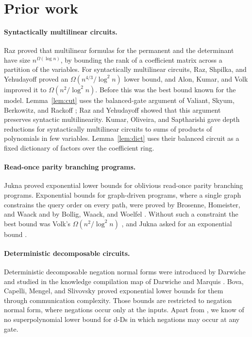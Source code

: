 \documentclass[11pt]{article}
\theoremstyle{remark}
\begin{document}
\section{Prior work}
\paragraph{Syntactically multilinear circuits.}
Raz \cite{raz} proved that multilinear formulas for the permanent and the
determinant have size \(n^{\Omega(\log n)}\), by bounding the rank of a
coefficient matrix across a partition of the variables. For syntactically
multilinear circuits, Raz, Shpilka, and Yehudayoff \cite{rsy} proved an
\(\Omega(n^{4/3}/\log^2 n)\) lower bound, and Alon, Kumar, and Volk \cite{akv}
improved it to \(\Omega(n^2/\log^2 n)\). Before \cite{hc} this was the best
bound known for the model. Lemma~\ref{lem:cut} uses the balanced-gate
argument of Valiant, Skyum, Berkowitz, and Rackoff \cite{vsbr}; Raz and
Yehudayoff \cite{ry} showed that this argument preserves syntactic
multilinearity. Kumar, Oliveira, and Saptharishi \cite{kos} gave depth
reductions for syntactically multilinear circuits to sums of products of
polynomials in few variables. Lemma~\ref{lem:dict} uses their balanced
circuit as a fixed dictionary of factors over the coefficient ring.

\paragraph{Read-once parity branching programs.}
Jukna \cite{juknacodes} proved exponential lower bounds for oblivious
read-once parity branching programs. Exponential bounds for graph-driven
programs, where a single graph constrains the query order on every path,
were proved by Brosenne, Homeister, and Waack \cite{bhw} and by Bollig,
Waack, and Woelfel \cite{bww}. Without such a constraint the best bound was
Volk's \(\Omega(n^2/\log^2 n)\) \cite{volk}, and Jukna asked for an exponential bound
\cite[Research Problem 16.14]{juknabook}.

\paragraph{Deterministic decomposable circuits.}
Deterministic decomposable negation normal forms were introduced by Darwiche
\cite{darwiche} and studied in the knowledge compilation map of Darwiche and
Marquis \cite{dm}. Bova, Capelli, Mengel, and Slivovsky \cite{bcms} proved
exponential lower bounds for them through communication complexity. Those
bounds are restricted to negation normal form, where negations occur only
at the inputs. Apart from \cite{hc}, we know of no superpolynomial lower
bound for d-Ds in which negations may occur at any gate.
\end{document}

